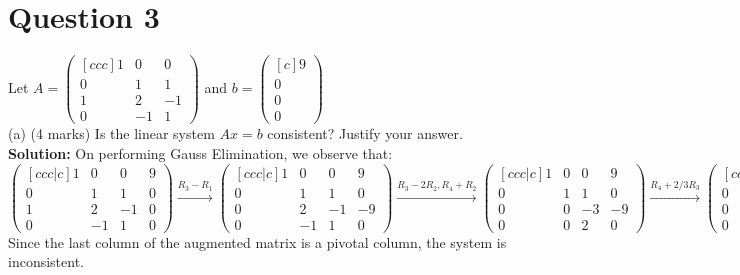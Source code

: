 \documentclass{article}
\begin{document}
\section*{Question 3}
\newline
Let $A = \begin{pmatrix}[ccc]
    1 & 0 & 0 \\
    0 & 1 & 1\\
    1 & 2 & -1 \\
    0 & -1 & 1
    \end{pmatrix}$ and $b = \begin{pmatrix}[c]
    9 \\ 0 \\ 0 \\ 0  \end{pmatrix}$
\newline
\newline
\\ (a) (4 marks) Is the linear system $Ax = b$ consistent? Justify your answer.
\newline
\textbf{Solution:}
On performing Gauss Elimination, we observe that:
$$
\begin{pmatrix}[ccc|c]
    1 & 0 & 0 & 9\\
    0 & 1 & 1 & 0\\
    1 & 2 & -1 & 0\\
    0 & -1 & 1 & 0
\end{pmatrix}
\xrightarrow{R_3 - R_1}
\begin{pmatrix}[ccc|c]
    1 & 0 & 0 & 9\\
    0 & 1 & 1 & 0\\
    0 & 2 & -1 & -9\\
    0 & -1 & 1 & 0
\end{pmatrix}
\xrightarrow{R_3 - 2R_2, R_4 + R_2}
\begin{pmatrix}[ccc|c]
    1 & 0 & 0 & 9\\
    0 & 1 & 1 & 0\\
    0 & 0 & -3 & -9\\
    0 & 0 & 2 & 0
\end{pmatrix}
\xrightarrow{R_4 + 2/3 R_3}
\begin{pmatrix}[ccc|c]
    1 & 0 & 0 & 9\\
    0 & 1 & 1 & 0\\
    0 & 0 & -3 & -9\\
    0 & 0 & 0 & -6
\end{pmatrix}
$$
Since the last column of the augmented matrix is a pivotal column, the system is inconsistent. 
\end{document}
